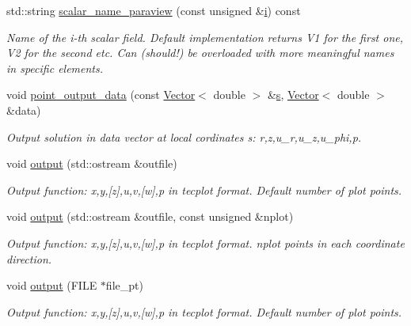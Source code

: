 \begin{DoxyCompactItemize}
std\+::string \hyperlink{classoomph_1_1GeneralisedNewtonianAxisymmetricNavierStokesEquations_a4f7c28c91fd5067017676dc8b6628c3d}{scalar\+\_\+name\+\_\+paraview} (const unsigned \&\hyperlink{cfortran_8h_adb50e893b86b3e55e751a42eab3cba82}{i}) const
\begin{DoxyCompactList}\small\item\em Name of the i-\/th scalar field. Default implementation returns V1 for the first one, V2 for the second etc. Can (should!) be overloaded with more meaningful names in specific elements. \end{DoxyCompactList}\item 
void \hyperlink{classoomph_1_1GeneralisedNewtonianAxisymmetricNavierStokesEquations_a8a97a39b3421984ca59a665be4abc2d8}{point\+\_\+output\+\_\+data} (const \hyperlink{classoomph_1_1Vector}{Vector}$<$ double $>$ \&\hyperlink{cfortran_8h_ab7123126e4885ef647dd9c6e3807a21c}{s}, \hyperlink{classoomph_1_1Vector}{Vector}$<$ double $>$ \&data)
\begin{DoxyCompactList}\small\item\em Output solution in data vector at local cordinates s\+: r,z,u\+\_\+r,u\+\_\+z,u\+\_\+phi,p. \end{DoxyCompactList}\item 
void \hyperlink{classoomph_1_1GeneralisedNewtonianAxisymmetricNavierStokesEquations_a25e906f89c3cec75081bd2fc88b37fd5}{output} (std\+::ostream \&outfile)
\begin{DoxyCompactList}\small\item\em Output function\+: x,y,\mbox{[}z\mbox{]},u,v,\mbox{[}w\mbox{]},p in tecplot format. Default number of plot points. \end{DoxyCompactList}\item 
void \hyperlink{classoomph_1_1GeneralisedNewtonianAxisymmetricNavierStokesEquations_a7c80af0c22f64c3484cdeac1edcbe28c}{output} (std\+::ostream \&outfile, const unsigned \&nplot)
\begin{DoxyCompactList}\small\item\em Output function\+: x,y,\mbox{[}z\mbox{]},u,v,\mbox{[}w\mbox{]},p in tecplot format. nplot points in each coordinate direction. \end{DoxyCompactList}\item 
void \hyperlink{classoomph_1_1GeneralisedNewtonianAxisymmetricNavierStokesEquations_a34a51e3ad73df1ddca173e59a1404c90}{output} (F\+I\+LE $\ast$file\+\_\+pt)
\begin{DoxyCompactList}\small\item\em Output function\+: x,y,\mbox{[}z\mbox{]},u,v,\mbox{[}w\mbox{]},p in tecplot format. Default number of plot points. \end{DoxyCompactList}\item 

\end{DoxyCompactItemize}
